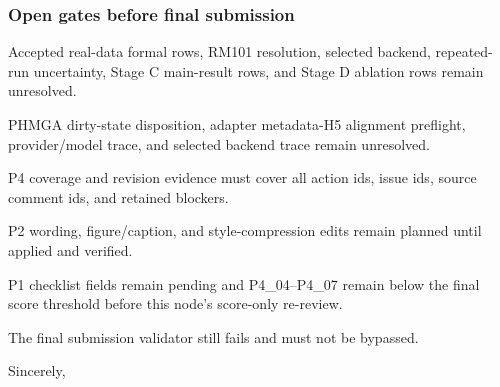 \subsubsection*{Open gates before final submission}
\begin{description}[leftmargin=3.2cm,style=nextline]
    \item[Formal evidence] Accepted real-data formal rows, RM101 resolution, selected backend, repeated-run uncertainty, Stage C main-result rows, and Stage D ablation rows remain unresolved.
    \item[Reproducibility] PHMGA dirty-state disposition, adapter metadata-H5 alignment preflight, provider/model trace, and selected backend trace remain unresolved.
    \item[Coverage] P4 coverage and revision evidence must cover all action ids, issue ids, source comment ids, and retained blockers.
    \item[Manuscript edits] P2 wording, figure/caption, and style-compression edits remain planned until applied and verified.
    \item[Checklist and scores] P1 checklist fields remain pending and P4\_04--P4\_07 remain below the final score threshold before this node's score-only re-review.
    \item[Validator] The final submission validator still fails and must not be bypassed.
\end{description}

\vspace{8em}

\noindent Sincerely,

\noindent\theauthor

\vfill
